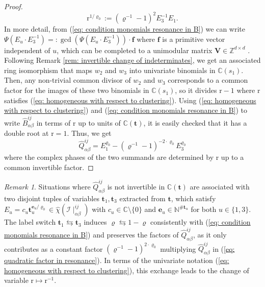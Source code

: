 \documentclass[10pt]{article}
\theoremstyle{remark}%
\newtheorem{rem}{Remark}%
\theoremstyle{definition}%
\begin{document}
\begin{proof}
\begin{equation}
\mathrm{r}^{1/\varrho_{0}}:=\left(\varrho^{-1}-1\right)^{2}E_{3}^{-1}E_{1}. 
\label{eq: homogeneous with respect to clustering}
 \end{equation}
In more detail, from (\ref{eq: condition monomials resonance in B}) we can write $\Psi(E_{u}\cdot E_{3}^{-1})=:\gcd(\Psi(E_{u}\cdot E_{3}^{-1}))\cdot\mathbf{f}$ where $\mathbf{f}$ is a primitive vector independent of $u$, which can be completed to a unimodular matrix $\mathbf{V}\in\mathbb{Z}^{d\times d}$ \cite{Newman1985}. Following Remark \ref{rem: invertible change of indeterminates}, we get an associated ring isomorphism 
that maps $w_{2}$ and $w_{3}$ into univariate binomials in $\mathbb{C}(s_{1})$. Then, 
any non-trivial common divisor of $w_{2}$ and $w_{3}$ corresponds to a common factor for the images of these two binomials in $\mathbb{C}(s_{1})$, so it divides $\mathrm{r}-1$ where $\mathrm{r}$ satisfies (\ref{eq: homogeneous with respect to clustering}). Using (\ref{eq: homogeneous with respect to clustering}) and (\ref{eq: condition monomials resonance in B}) to write $\hat{B}_{\alpha\beta}^{ij}$ in terms of $\mathrm{r}$ up to units of $\mathbb{C}(\mathbf{t})$, it is easily checked that it has a double root at $\mathrm{r}=1$. Thus, we get 
 \begin{equation}
\hat{Q}_{\alpha\beta}^{ij}=E_{1}^{\varrho_{0}}-\left(\varrho^{-1}-1\right)^{-2\cdot\varrho_{0}}E_{3}^{\varrho_{0}}
\label{eq: quadratic factor in resonance}
 \end{equation}
where the complex phases of the two summands are determined by $\mathrm{r}$ up to a common invertible factor.  
\end{proof} 
\begin{rem}
\label{rem: homogeneous coordinate}
Situations where $\hat{Q}_{\alpha\beta}^{ij}$ is not invertible in $\mathbb{C}(\mathbf{t})$ are associated with two disjoint tuples of variables $\mathbf{t}_{1},\mathbf{t}_{3}$ extracted from $\mathbf{t}$, which satisfy $E_{u}=c_{u}\mathbf{t}_{u}^{\mathbf{e}_{u}/\varrho_{0}}\in\hat{\chi}(\mathcal{I}\mid_{\alpha\beta}^{ij})$ with $c_{u}\in\mathbb{C}\setminus\{0\}$ and 
$\mathbf{e}_{u}\in\mathbb{N}^{\#\mathbf{t}_{u}}$ for both $u\in\{1,3\}$. The label switch $\mathbf{t}_{1}\leftrightarrows\mathbf{t}_{3}$ induces $\varrho\leftrightarrows1-\varrho$ consistently with (\ref{eq: condition monomials resonance in B}) and preserves the factors of $\hat{Q}_{\alpha\beta}^{ij}$, as it only contributes as a constant factor $(\varrho^{-1}-1)^{2\cdot\varrho_{0}}$ multiplying
$\hat{Q}_{\alpha\beta}^{ij}$ in (\ref{eq: quadratic factor in resonance}). In terms of the univariate notation (\ref{eq: homogeneous with respect to clustering}), this exchange leads to the change of variable $\mathrm{r}\mapsto\mathrm{r}^{-1}$.
\end{rem}
\end{document}
